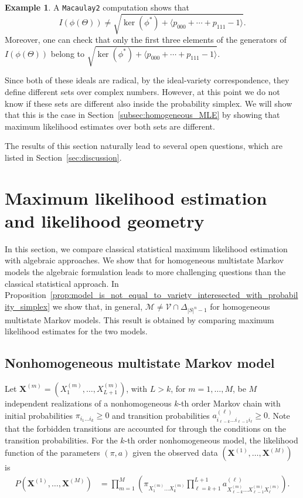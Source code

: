 \documentclass[11pt, a4paper]{article}
\numberwithin{equation}{section}
\theoremstyle{plain}
\theoremstyle{definition}
\newtheorem{example}{Example}
\begin{document}
\begin{example}
A \texttt{Macaulay2} computation shows that 
\[
I(\phi(\Theta)) \neq \sqrt{\ker(\phi^*)+\langle p_{000}+\cdots+p_{111}-1\rangle}.
\]
Moreover, one can check that only the first three elements of the generators of $I(\phi(\Theta))$ belong to $\sqrt{\ker(\phi^*)+\langle p_{000}+\cdots+p_{111}-1\rangle}$. 



Since both of these ideals are radical, by the ideal-variety correspondence, they define different sets over complex numbers. However, at this point we do not know if these sets are different also inside the probability simplex. We will show that this is the case in Section~\ref{subsec:homogeneous_MLE} by showing that maximum likelihood estimates over both sets are different.
\end{example}

The results of this section naturally lead to several open questions, which are listed in Section~\ref{sec:discussion}.






\section{Maximum likelihood estimation and likelihood geometry}
\label{sec:mle}


In this section, we compare classical statistical maximum likelihood estimation with algebraic approaches. We show
that for homogeneous multistate Markov models the algebraic formulation leads to more challenging questions than the
classical statistical approach. In Proposition~\ref{prop:model_is_not_equal_to_variety_interesected_with_probability_simplex} we show that, in general, $\mathcal{M} \neq \mathcal{V} \cap \Delta_{|S|^n-1}$ for homogeneous multistate Markov models. This result is obtained by comparing maximum likelihood estimates for the two models. 

\subsection{Nonhomogeneous multistate Markov model}

Let $\mathbf{X}^{(m)}=(X^{(m)}_1,\dots,X^{(m)}_{L+1})$, with $L>k$, for $m=1,\dots,M$, be $M$ independent realizations of a nonhomogeneous $k$-th order Markov chain with initial probabilities $\pi_{i_1\dots i_k} \geq 0$ and transition probabilities $a^{(\ell)}_{i_{\ell-k}\dots i_{\ell-1}i_\ell} \ge  0$.  Note that the forbidden transitions are accounted for through the conditions on the transition probabilities.  
For the $k$-th order nonhomogeneous model, the likelihood function of the parameters $(\pi,a)$ given the observed data $(\mathbf{X}^{(1)},\dots,\mathbf{X}^{(M)})$ is
\begin{align}
\label{eqn:likelihood_function_nonhomogeneous}
P(\mathbf{X}^{(1)},\dots,\mathbf{X}^{(M)})
&=
\prod_{m=1}^{M}
\left(
\pi_{X^{(m)}_1\dots X^{(m)}_k}
\prod_{\ell=k+1}^{L+1}
a^{(\ell)}_{X^{(m)}_{\ell-k}\dots X^{(m)}_{\ell-1}X^{(m)}_\ell}
\right).
\end{align}
\end{document}

